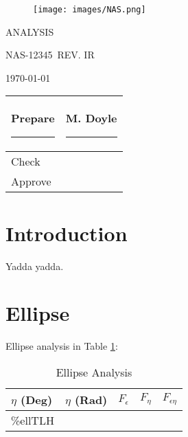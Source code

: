 \documentclass[11pt]{article}
\def\Title{ANALYSIS}
\def\DocID{NAS-12345}
\def\Rev{IR}
\def\docDate{}
\def\Preparer{M. Doyle}
\def\Checker{}
\def\Approver{}
\begin{document}
\begin{titlepage}
\centering
\vspace*{100pt}
\begin{figure}[h!]
\texttt{[image: images/NAS.png]}
\end{figure}

\vspace{130pt}

{\fontsize{30}{36} \titlfont \Title}

\vspace{70pt}

{\fontsize{30}{36} \titlfont \DocID\ REV. \Rev}

\vspace{10pt}

\ifx\docDate\empty
  \today
\else
  \docDate
\fi

\begin{table}[b]
    \centering
    \begin{tabular}{|l|l|}
        \hline Prepare\rule{30pt}{0pt} & \Preparer\rule{50pt}{0pt} \\
        \hline Check & \Checker\\
        \hline Approve & \Approver\\\hline
    \end{tabular}
\end{table}
\end{titlepage}
\setcounter{page}{1}

\section{Introduction}

Yadda yadda.
\clearpage
\section{Ellipse}

Ellipse analysis in Table \ref{tab:EA1}:

\begin{table}[h]
    \centering
    \begin{tabular}{|l|l|l|l|l|}
        \hline \rowcolor{tablue} \textbf{$\eta$ (Deg)} & \textbf{$\eta$ (Rad)} & \textbf{$F_\epsilon$} & \textbf{$F_\eta$} & \textbf{$F_{\epsilon\eta}$}\\\hline
		{\%ellTLH}
    \end{tabular}
	\caption{Ellipse Analysis}
	\label{tab:EA1}
\end{table}
\end{document}
